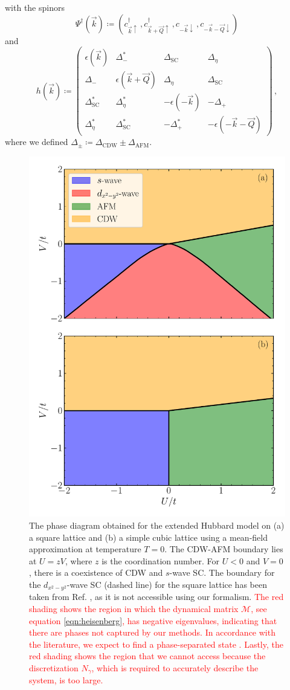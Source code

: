 \documentclass[
    reprint, 
    aps,
    preprintnumbers,
    twocolumn,
    prb,
    superscriptaddress
]{revtex4-2}
\newcommand{\vk}{\vec{k}}
\newcommand{\vQ}{\vec{Q}}
\newcommand{\up}{\uparrow}
\newcommand{\down}{\downarrow}
\newcommand{\kplusQ}{\vk+\vQ}
\newcommand{\kminusQ}{-\vk-\vQ}
\newcommand{\mM}{\mathcal{M}}
\begin{document}
with the spinors
\begin{equation}
    \Psi^\dagger (\vk) \coloneqq  \left( c_{\vk\up}^\dagger\,, c_{\kplusQ\up}^\dagger\,, c_{-\vk\down}\,, c_{\kminusQ\down} \right)
\end{equation}
and 
\begin{equation}
    h(\vk) \coloneqq  \begin{pmatrix}
        \epsilon (\vk) & \Delta_-^* & \Delta_\text{SC} & \Delta_\eta \\
        \Delta_- & \epsilon (\vk + \vQ) & \Delta_\eta & \Delta_\text{SC} \\
        \Delta_\text{SC}^* & \Delta_\eta^* & - \epsilon (-\vk) & - \Delta_+ \\
        \Delta_\eta^* & \Delta_\text{SC}^* & - \Delta_+^* & - \epsilon (-\vk - \vQ)
        \end{pmatrix}\,,
\end{equation}
where we defined $\Delta_\pm \coloneqq \Delta_\text{CDW} \pm \Delta_\text{AFM}$.

\begin{figure}
    \centering
    \includegraphics[width=.48\textwidth]{plots/phase_diagram.pdf}
    \caption{The phase diagram obtained for the extended Hubbard model on 
    (a) a square lattice and (b) a simple cubic lattice using a mean-field approximation at temperature $T=0$.
    The CDW-AFM boundary lies at $U = zV$, where $z$ is the coordination number. 
    For $U<0$ and $V=0$, there is a coexistence of CDW and $s$-wave SC.
    The boundary for the $d_{x^2 - y^2}$-wave SC (dashed line) for the square lattice has been taken from Ref. \cite{Micnas88b}, 
    as it is not accessible using our formalism.
    \textcolor{red}{The red shading shows the region in which the dynamical matrix $\mM$, see equation \eqref{eqn:heisenberg}, has negative eigenvalues, 
    indicating that there are phases not captured by our methods.
    In accordance with the literature, we expect to find a phase-separated state \cite{Linner23}.
    Lastly, the red shading shows the region that we cannot access because the discretization $N_\gamma$, 
    which is required to accurately describe the system, is too large.}}
    \label{fig:phase_diagram}
\end{figure}
\end{document}
